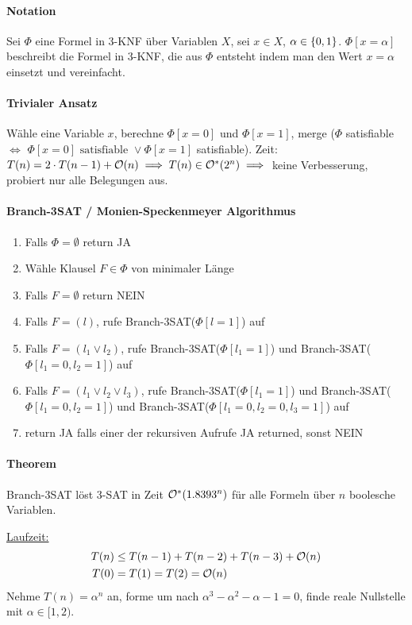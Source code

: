 \paragraph{Notation}
Sei $\Phi$ eine Formel in 3-KNF über Variablen $X$, sei $x \in X$, $\alpha \in \lbrace 0, 1 \rbrace$.
$\Phi[x=\alpha]$ beschreibt die Formel in 3-KNF, die aus $\Phi$ entsteht indem man den Wert $x=\alpha$ einsetzt
und vereinfacht.

\paragraph{Trivialer Ansatz}
Wähle eine Variable $x$, berechne $\Phi[x=0]$ und $\Phi[x=1]$,
merge ($\Phi$ satisfiable $\iff$ $\Phi[x=0] \text{ satisfiable } \vee \Phi[x=1]$ satisfiable).
Zeit: $T(n) = 2 \cdot T(n-1) + \mathcal{O}(n) \implies T(n) \in \mathcal{O}^*(2^n) \implies$ keine Verbesserung,
probiert nur alle Belegungen aus.

\paragraph{Branch-3SAT / Monien-Speckenmeyer Algorithmus}
\begin{enumerate}
    \item Falls $\Phi = \emptyset$ return JA
    \item Wähle Klausel $F \in  \Phi$ von minimaler Länge
    \item Falls $F = \emptyset$ return NEIN
    \item Falls $F = (l)$, rufe Branch-3SAT($\Phi[l=1]$) auf
    \item Falls $F = (l_1 \vee l_2)$, rufe Branch-3SAT($\Phi[l_1=1]$) und Branch-3SAT($\Phi[l_1=0, l_2=1]$) auf
    \item Falls $F = (l_1 \vee l_2 \vee l_3)$, rufe Branch-3SAT($\Phi[l_1=1]$) und
    Branch-3SAT($\Phi[l_1=0, l_2=1]$) und Branch-3SAT($\Phi[l_1=0, l_2=0, l_3=1]$) auf
    \item return JA falls einer der rekursiven Aufrufe JA returned, sonst NEIN
\end{enumerate}

\paragraph{Theorem}
Branch-3SAT löst 3-SAT in Zeit $\mathcal{O}^* (1.8393^n)$ für alle Formeln über $n$ boolesche Variablen.

\underline{Laufzeit:}
\begin{align*}
T(n) &\leq T(n-1) + T(n-2) + T(n-3) + \mathcal{O}(n) \\
T(0) &= T(1) = T(2) = \mathcal{O}(n)
\end{align*}
Nehme $T(n) = \alpha^n$ an, forme um nach $\alpha^3 - \alpha^2 - \alpha - 1 = 0$,
finde reale Nullstelle mit $\alpha \in [1,2)$.









